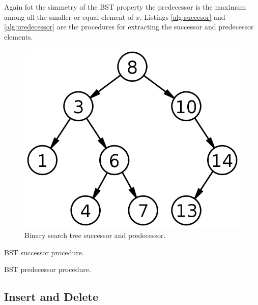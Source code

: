 Again fot the simmetry of the BST property the predecessor is the maximum among all the smaller or equal element of $x$. 
Listings \ref{alg:succesor} and \ref{alg:predecessor} are the procedures for extracting the successor and predecessor elements.

	\begin{figure}
	\label{fig:bst_successor}
	\centering
		\includegraphics[scale=0.5]{../images/bst_successor}
		\caption{Binary search tree successor and predecessor.}
	\end{figure}
\begin{algorithm}
\caption{BST successor procedure.}\label{alg:successor}
\end{algorithm}

\begin{algorithm}
\caption{BST predecessor procedure.}\label{alg:successor}
\end{algorithm}

\subsection{Insert and Delete}

